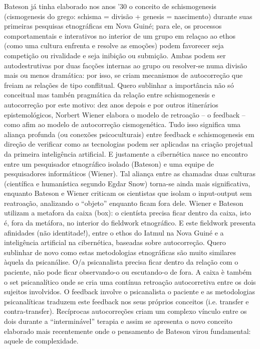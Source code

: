\documentclass[a4paper, 12pt]{article} %
\begin{document}
Bateson já tinha elaborado nos anos  ’30 o conceito de schismogenesis (cismogenesis do grego: schisma = divisão +  genesis = nascimento) durante suas primeiras pesquisas etnográficas em Nova Guiné; para ele,  os processos comportamentais e interativos no interior de um grupo em relaçao ao ethos (como uma cultura enfrenta e resolve as emoções) podem favorecer seja competição ou rivalidade e seja inibição ou submição. Ambas  podem ser autodestrutivas por duas facções internas ao grupo ou resolver-se numa divisão mais ou menos dramática: por isso, se criam mecanismos de autocorreção que freiam as relações de tipo conflitual. Quero sublinhar a importância não só conceitual mas tambén pragmática da relação entre schismogenesis e autocorreção por este motivo: dez anos depois e por outros itinerários epistemológicos, Norbert Wiener elabora o modelo de retroação – o feedback – como afim ao modelo de autocorreção cismogenética. Tudo isso significa uma aliança profunda (ou conexões psicoculturais) entre feedback e schismogenesis em direção de verificar como as tecnologias podem ser aplicadas na criação projetual da primeira inteligência artificial. E justamente a cibernética nasce no encontro entre um pesquisador etnográfico isolado (Bateson) e uma equipe de pesquisadores informáticos (Wiener). Tal aliança entre as chamadas duas culturas (científica e humanística segundo Egdar Snow) torna-se ainda mais significativa, enquanto Bateson e Wiener criticam os cientistas que isolam o input-output sem reatroação, analizando o “objeto” enquanto ficam fora dele. Wiener e Bateson utilizam a metafora da caixa (box): o cientísta precisa ficar dentro da caixa, isto é, fora da metáfora, no interior do fieldwork etnográfico. E este fieldwork presenta afinidades (não identitade!), entre o ethos do Iatmul na Nova Guiné e  a inteligência artificial na cibernética, baseadas sobre autocorreção. Quero sublinhar de novo como estas metodologias etnográficas  são muito similares àquela da psicanálise. O/a psicanalista precisa ficar dentro da relação com o paciente, não pode ficar observando-o ou escutando-o de fora. A caixa è também o set psicanalítico onde se cria uma contínua retroação autocorretiva entre os dois sujeitos involvidos. O feedback involve o psicanalista o paciente e as metodologias psicanalíticas traduzem este feedback nos seus próprios conceitos (i.e. transfer e contra-transfer). Recíprocas autocorreções criam um complexo vínculo entre os dois durante a “interminável” terapia e assim se apresenta o novo conceito elaborado mais recentemente onde o pensamento de Bateson virou fundamental: aquele de complexidade.
\end{document}
